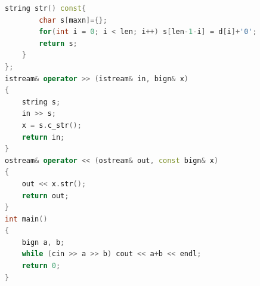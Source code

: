 \documentclass[a4paper]{book}
\begin{document}
\begin{lstlisting}[language=c++]
    string str() const{
        char s[maxn]={};
        for(int i = 0; i < len; i++) s[len-1-i] = d[i]+'0';
        return s;
    }
};
istream& operator >> (istream& in, bign& x)
{
    string s;
    in >> s;
    x = s.c_str();
    return in;
} 
ostream& operator << (ostream& out, const bign& x)
{
    out << x.str();
    return out;
}
int main()
{
    bign a, b;
    while (cin >> a >> b) cout << a+b << endl;
    return 0;
}
\end{lstlisting}
\ifx\allfiles\undefined
\end{document}

